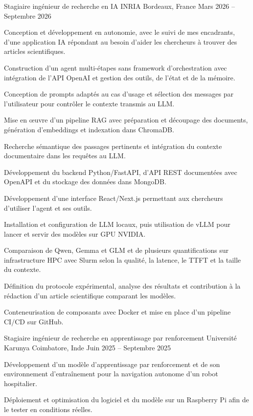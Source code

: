 
\begin{cventries}
  \cventry
    {Stagiaire ingénieur de recherche en IA}
    {INRIA}
    {Bordeaux, France}
    {Mars 2026 -- Septembre 2026}
    {
      \begin{cvitems}
        \item {Conception et développement en autonomie, avec le suivi de mes encadrants, d’une application IA répondant au besoin d’aider les chercheurs à trouver des articles scientifiques.}
        \item {Construction d’un agent multi-étapes sans framework d’orchestration avec intégration de l’API OpenAI et gestion des outils, de l’état et de la mémoire.}
        \item {Conception de prompts adaptés au cas d’usage et sélection des messages par l’utilisateur pour contrôler le contexte transmis au LLM.}
        \item {Mise en œuvre d’un pipeline RAG avec préparation et découpage des documents, génération d’embeddings et indexation dans ChromaDB.}
        \item {Recherche sémantique des passages pertinents et intégration du contexte documentaire dans les requêtes au LLM.}
        \item {Développement du backend Python/FastAPI, d’API REST documentées avec OpenAPI et du stockage des données dans MongoDB.}
        \item {Développement d’une interface React/Next.js permettant aux chercheurs d’utiliser l’agent et ses outils.}
        \item {Installation et configuration de LLM locaux, puis utilisation de vLLM pour lancer et servir des modèles sur GPU NVIDIA.}
        \item {Comparaison de Qwen, Gemma et GLM et de plusieurs quantifications sur infrastructure HPC avec Slurm selon la qualité, la latence, le TTFT et la taille du contexte.}
        \item {Définition du protocole expérimental, analyse des résultats et contribution à la rédaction d’un article scientifique comparant les modèles.}
        \item {Conteneurisation de composants avec Docker et mise en place d’un pipeline CI/CD sur GitHub.}
      \end{cvitems}
    }

  \cventry
    {Stagiaire ingénieur de recherche en apprentissage par renforcement}
    {Université Karunya}
    {Coimbatore, Inde}
    {Juin 2025 -- Septembre 2025}
    {
      \begin{cvitems}
        \item {Développement d’un modèle d’apprentissage par renforcement et de son environnement d’entraînement pour la navigation autonome d’un robot hospitalier.}
        \item {Déploiement et optimisation du logiciel et du modèle sur un Raspberry Pi afin de le tester en conditions réelles.}
      \end{cvitems}
    }
\end{cventries}
